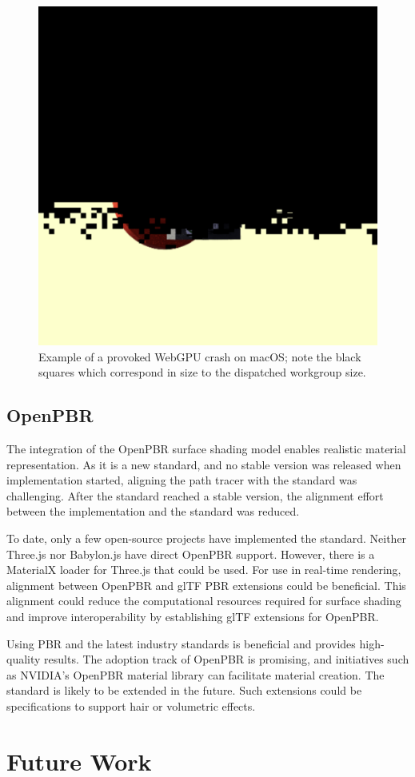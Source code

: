 \begin{figure}[H]
  \centering
  \includegraphics[width=0.35\columnwidth]{resources/webgpu-crashes.png}
  \caption{Example of a provoked \gls{WebGPU} crash on macOS; note the black squares which correspond in size to the dispatched workgroup size.}
  \label{fig:webgpu-crash}
\end{figure}

\subsection*{OpenPBR}

The integration of the \gls{OpenPBR} surface shading model enables realistic material representation. As it is a new standard, and no stable version was released when implementation started, aligning the path tracer with the standard was challenging. After the standard reached a stable version, the alignment effort between the implementation and the standard was reduced.

To date, only a few open-source projects have implemented the standard. Neither \gls{Three.js} nor \gls{Babylon.js} have direct \gls{OpenPBR} support. However, there is a \gls{MaterialX} loader for \gls{Three.js} that could be used. For use in real-time rendering, alignment between \gls{OpenPBR} and \gls{glTF} \gls{PBR} extensions could be beneficial. This alignment could reduce the computational resources required for surface shading and improve interoperability by establishing \gls{glTF} extensions for \gls{OpenPBR}.

Using \gls{PBR} and the latest industry standards is beneficial and provides high-quality results. The adoption track of \gls{OpenPBR} is promising, and initiatives such as NVIDIA's \gls{OpenPBR} material library \cite{omniverseOpenPBR} can facilitate material creation. The standard is likely to be extended in the future. Such extensions could be specifications to support hair or volumetric effects.

\section{Future Work}

